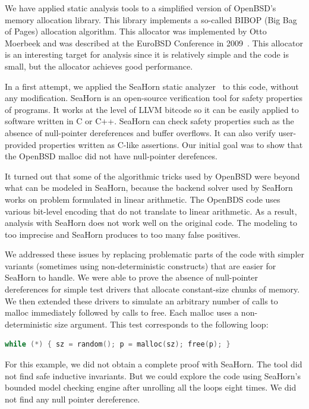 \documentclass[twoside,12pt]{cslreport}
\begin{document}
We have applied static analysis tools to a simplified version of
OpenBSD's memory allocation library. This library implements a
so-called BIBOP (Big Bag of Pages) allocation algorithm. This
allocator was implemented by Otto Moerbeek and was described at the
EuroBSD Conference in 2009~\cite{Moerbeek2009}. This allocator is an
interesting target for analysis since it is relatively simple and the
code is small, but the allocator achieves good performance.

In a first attempt, we applied the SeaHorn static
analyzer~\cite{Gurfinkel+etal:SeaHorn:2015} to this code, without any
modification. SeaHorn is an open-source verification tool for safety
properties of programs. It works at the level of LLVM bitcode so it
can be easily applied to software written in C or C++. SeaHorn can
check safety properties such as the absence of null-pointer
dereferences and buffer overflows. It can also verify user-provided
properties written as C-like assertions. Our initial goal was to show
that the OpenBSD malloc did not have null-pointer derefences.

It turned out that some of the algorithmic tricks used by OpenBSD were
beyond what can be modeled in SeaHorn, because the backend solver used
by SeaHorn works on problem formulated in linear arithmetic. The
OpenBDS code uses various bit-level encoding that do not translate to
linear arithmetic. As a result, analysis with SeaHorn does not work
well on the original code. The modeling to too imprecise and SeaHorn
produces to too many false positives.

We addressed these issues by replacing problematic parts of the code
with simpler variants (sometimes using non-deterministic constructs)
that are easier for SeaHorn to handle. We were able to prove the
absence of null-pointer dereferences for simple test drivers that
allocate constant-size chunks of memory. We then extended these
drivers to simulate an arbitrary number of calls to malloc immediately
followed by calls to free. Each malloc uses a non-deterministic size
argument. This test corresponds to the following loop:
\begin{lstlisting}[language=C]
    while (*) { sz = random(); p = malloc(sz); free(p); }
\end{lstlisting}
For this example, we did not obtain a complete proof with SeaHorn. The
tool did not find safe inductive invariants. But we could explore the
code using SeaHorn's bounded model checking engine after unrolling all
the loops eight times. We did not find any null pointer dereference.
\end{document}
